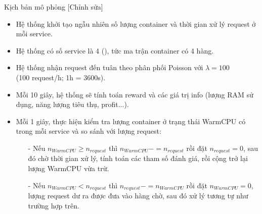 \documentclass[10pt,aspectratio=169]{beamer}
\begin{document}
\begin{frame}{Kịch bản mô phỏng [Chỉnh sửa]}
\begin{itemize}
\setlength\itemsep{8pt}
\item Hệ thống khởi tạo ngẫu nhiên số lượng container và thời gian xử lý request ở mỗi service.
\item Hệ thống có số service là 4 (), tức ma trận container có 4 hàng.
\item Hệ thống nhận request đến tuân theo phân phối Poisson với $ \lambda = 100 $ \\
      (100 request/h; 1h = 3600s).
\item Mỗi 10 giây, hệ thống sẽ tính toán reward và các giá trị info (lượng RAM sử dụng, năng lượng tiêu thụ, profit...).
\item Mỗi 1 giây, thực hiện kiểm tra lượng container ở trạng thái WarmCPU có trong mỗi service và so sánh với lượng request:
\begin{itemize}
\setlength\itemsep{4pt}
\item[-] Nếu $ n_{WarmCPU} \geq n_{request} $ thì $ n_{WarmCPU} -= n_{request} $ rồi đặt $ n_{request} = 0 $, sau đó chờ thời gian xử lý, tính toán các tham số đánh giá, rồi cộng trở lại lượng WarmCPU vừa trừ.
\item[-] Nếu $ n_{WarmCPU} < n_{request} $ thì $ n_{request} -= n_{WarmCPU} $ rồi đặt $ n_{WarmCPU} = 0 $, lượng request dư ra được đưa vào hàng chờ, sau đó xử lý tương tự như trường hợp trên.
\end{itemize}
\end{itemize}
\end{frame}
\end{document}
